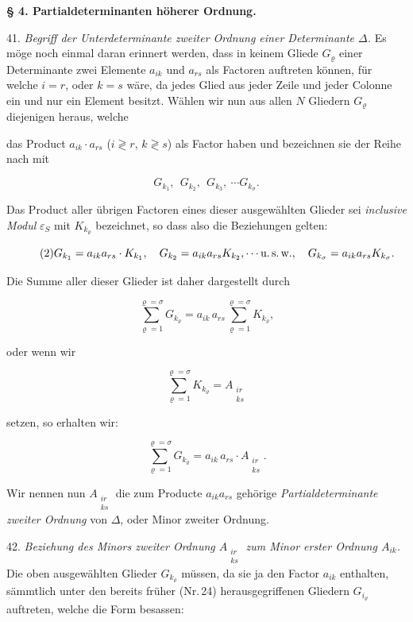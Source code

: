 \documentclass[11pt]{article}
\providecommand{\weberpage}[1]{}
\providecommand{\weq}[2]{\begin{equation}\tag{#1}#2\end{equation}}
\let\Delta\varDelta
\begin{document}
\begin{center}
\textbf{§ 4. Partialdeterminanten höherer Ordnung.}
\end{center}

41. \textit{Begriff der Unterdeterminante zweiter Ordnung einer Determinante $\Delta$.} Es möge noch einmal daran erinnert werden, dass in keinem Gliede $G_\varrho$ einer Determinante zwei Elemente $a_{ik}$ und $a_{rs}$ als Factoren auftreten können, für welche $i=r$, oder $k=s$ wäre, da jedes Glied aus jeder Zeile und jeder Colonne ein und nur ein Element besitzt. Wählen wir nun aus allen $N$ Gliedern $G_\varrho$ diejenigen heraus, welche


\weberpage{48}
das Product $a_{ik}\cdot a_{rs}$ ($i\gtrless r$, $k\gtrless s$) als Factor haben und bezeichnen sie der Reihe nach mit

\weq{1}{G_{k_1},\ \ G_{k_2},\ \ G_{k_3},\ \cdots G_{k_\sigma}.}

Das Product aller übrigen Factoren eines dieser ausgewählten Glieder sei \textit{inclusive Modul} $\varepsilon_S$ mit $K_{k_\varrho}$ bezeichnet, so dass also die Beziehungen gelten:

\weq{2}{G_{k_1}=a_{ik}a_{rs}\cdot K_{k_1},\quad G_{k_2}=a_{ik}a_{rs}K_{k_2},\cdots \text{u.\,s.\,w.},\quad G_{k_\sigma}=a_{ik}a_{rs}K_{k_\sigma}.}

Die Summe aller dieser Glieder ist daher dargestellt durch

\weq{3}{\sum_{\varrho=1}^{\varrho=\sigma} G_{k_\varrho} = a_{ik}\,a_{rs}\sum_{\varrho=1}^{\varrho=\sigma} K_{k_\varrho},}

oder wenn wir

\weq{4}{\sum_{\varrho=1}^{\varrho=\sigma} K_{k_\varrho} = A_{\substack{ir\\ks}}}

setzen, so erhalten wir:

\weq{5}{\sum_{\varrho=1}^{\varrho=\sigma} G_{k_\varrho} = a_{ik}\,a_{rs}\cdot A_{\substack{ir\\ks}}.}

Wir nennen nun $A_{\substack{ir\\ks}}$ die zum Producte $a_{ik}a_{rs}$ gehörige \textit{Partialdeterminante zweiter Ordnung} von $\Delta$, oder Minor zweiter Ordnung.

42. \textit{Beziehung des Minors zweiter Ordnung $A_{\substack{ir\\ks}}$ zum Minor erster Ordnung $A_{ik}$.} Die oben ausgewählten Glieder $G_{k_\varrho}$ müssen, da sie ja den Factor $a_{ik}$ enthalten, sämmtlich unter den bereits früher (Nr.\,24) herausgegriffenen Gliedern $G_{i_\varrho}$ auftreten, welche die Form besassen:
\end{document}
